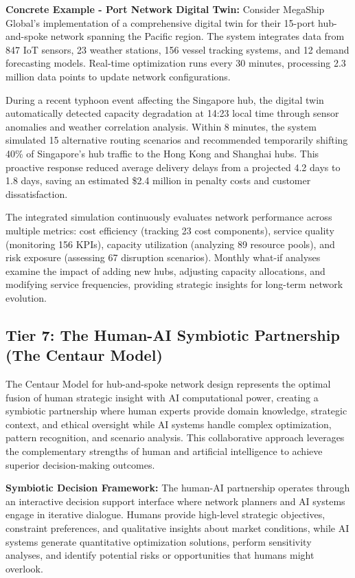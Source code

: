 \documentclass{article}
\begin{document}
\textbf{Concrete Example - Port Network Digital Twin:}
Consider MegaShip Global's implementation of a comprehensive digital twin for their 15-port hub-and-spoke network spanning the Pacific region. The system integrates data from 847 IoT sensors, 23 weather stations, 156 vessel tracking systems, and 12 demand forecasting models. Real-time optimization runs every 30 minutes, processing 2.3 million data points to update network configurations.

During a recent typhoon event affecting the Singapore hub, the digital twin automatically detected capacity degradation at 14:23 local time through sensor anomalies and weather correlation analysis. Within 8 minutes, the system simulated 15 alternative routing scenarios and recommended temporarily shifting 40\% of Singapore's hub traffic to the Hong Kong and Shanghai hubs. This proactive response reduced average delivery delays from a projected 4.2 days to 1.8 days, saving an estimated \$2.4 million in penalty costs and customer dissatisfaction.

The integrated simulation continuously evaluates network performance across multiple metrics: cost efficiency (tracking 23 cost components), service quality (monitoring 156 KPIs), capacity utilization (analyzing 89 resource pools), and risk exposure (assessing 67 disruption scenarios). Monthly what-if analyses examine the impact of adding new hubs, adjusting capacity allocations, and modifying service frequencies, providing strategic insights for long-term network evolution.

\subsection{Tier 7: The Human-AI Symbiotic Partnership (The Centaur Model)}

The Centaur Model for hub-and-spoke network design represents the optimal fusion of human strategic insight with AI computational power, creating a symbiotic partnership where human experts provide domain knowledge, strategic context, and ethical oversight while AI systems handle complex optimization, pattern recognition, and scenario analysis. This collaborative approach leverages the complementary strengths of human and artificial intelligence to achieve superior decision-making outcomes.

\textbf{Symbiotic Decision Framework:}
The human-AI partnership operates through an interactive decision support interface where network planners and AI systems engage in iterative dialogue. Humans provide high-level strategic objectives, constraint preferences, and qualitative insights about market conditions, while AI systems generate quantitative optimization solutions, perform sensitivity analyses, and identify potential risks or opportunities that humans might overlook.
\end{document}
